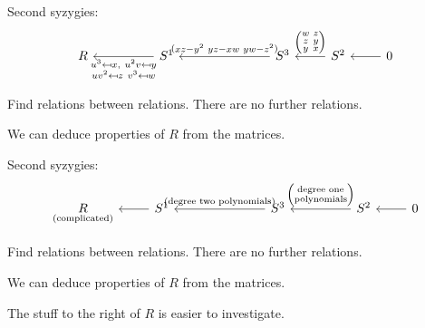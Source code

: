 \documentclass[mathserif
, handout
]{beamer}
\begin{document}
\begin{frame}
    Second syzygies:
\[\begin{tikzcd}[ampersand replacement=\&]
	R \&\& {S^1} \&\&\& {S^3} \& {S^2} \& 0
	\arrow["{\Big(\!\begin{smallmatrix}w & z \\ z & y \\ y & x \end{smallmatrix}\!\Big)}"', from=1-7, to=1-6]
	\arrow["{(\!\begin{smallmatrix}xz-y^2 & yz-xw & yw-z^2\end{smallmatrix}\!)}"', from=1-6, to=1-3]
	\arrow["{\substack{u^3 \mapsfrom x, ~u^2v \mapsfrom y\\ uv^2 \mapsfrom z ~v^3 \mapsfrom w}}", from=1-3, to=1-1]
	\arrow[from=1-8, to=1-7]
\end{tikzcd}\]

Find relations between relations. There are no further relations.

We can deduce properties of $R$ from the matrices.
\end{frame}

\begin{frame}
    Second syzygies:
\[\begin{tikzcd}[ampersand replacement=\&]
	{\underset{\text{(complicated)}}{R}} \& {S^1} \&\&\& {S^3} \&\& {S^2} \& 0
	\arrow["{(\!\begin{smallmatrix}\text{degree two polynomials}\end{smallmatrix}\!)}"', from=1-5, to=1-2]
	\arrow[from=1-2, to=1-1]
	\arrow[from=1-8, to=1-7]
	\arrow["{\Big(\!\begin{smallmatrix} \text{degree one}\\\text{polynomials} \end{smallmatrix}\!\Big)}"', from=1-7, to=1-5]
\end{tikzcd}\]

Find relations between relations. There are no further relations.

We can deduce properties of $R$ from the matrices.

The stuff to the right of $R$ is easier to investigate.
\end{frame}
\end{document}
